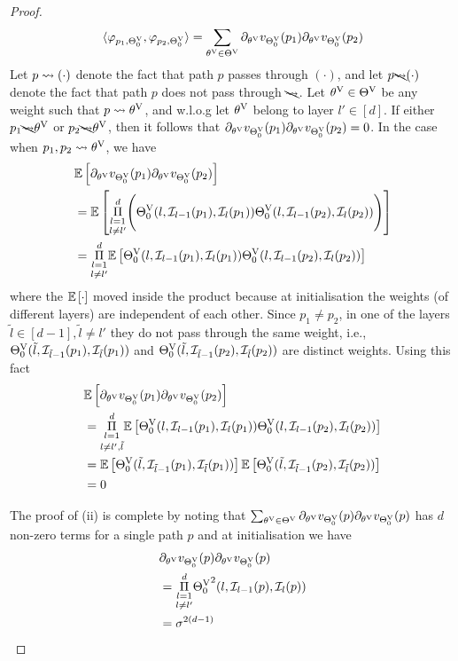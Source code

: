 \begin{appendix}
\begin{proof}
\begin{align*}
\ip{\varphi_{p_1,\Tv_0}, \varphi_{p_2,\Tv_0}}= \sum_{\tv\in \Tv} \partial_{\tv}v_{\Tv_0}(p_1) \partial_{\tv}v_{\Tv_0}(p_2)
\end{align*}
Let $p\rsa(\cdot)$ denote the fact that path $p$ passes through $(\cdot)$, and let $p\bcancel\rsa(\cdot)$ denote the fact that path $p$ does not pass through $\bcancel\rsa$. Let $\tv\in\Tv$ be any weight such that $p\rsa \tv$, and w.l.o.g let $\tv$ belong to layer $l'\in[d]$. If either $p_1\bcancel{\rsa}\tv$ or $p_2\bcancel{\rsa}\tv$, then it follows that $\partial_{\tv} v_{\Tv_0}(p_1) \partial_{\tv} v_{\Tv_0}(p_2)=0$. In the case when $p_1,p_2\rsa\tv$, we have
\begin{align*}
&\E{\partial_{\tv}v_{\Tv_0}(p_1)\partial_{\tv}v_{\Tv_0}(p_2)}\\
&=\E{\underset{l\neq l'}{\underset{l=1}{\overset{d}{\Pi}}} \Bigg(\Tv_0(l, \I_{l-1}(p_1),\I_{l} (p_1))\Tv_0(l,\I_{l-1} (p_2),\I_{l}(p_2)) \Bigg)}\\
&=\underset{l\neq l'}{\underset{l=1}{\overset{d}{\Pi}}}\E{\Tv_0(l,\I_{l-1}(p_1),\I_{l}(p_1))\Tv_0(l,\I_{l-1}(p_2),\I_{l}(p_2))}
\end{align*}
where the $\E{\cdot}$ moved inside the product because at initialisation the weights (of different layers) are independent of each other.
Since $p_1\neq p_2$, in one of the layers $\tilde{l}\in[d-1],\tilde{l}\neq l'$ they do not pass through the same weight, i.e., $\Tv_0(\tilde{l},\I_{\tilde{l}-1}(p_1),\I_{\tilde{l}}(p_1))$ and $\Tv_0(\tilde{l},\I_{\tilde{l}-1}(p_2),\I_{\tilde{l}}(p_2))$ are distinct weights. Using this fact
\begin{align*}
&\E{\partial_{\tv}v_{\Tv_0}(p_1)\partial_{\tv}v_{\Tv_0}(p_2)}\\
&=\underset{l\neq l',\tilde{l}}{\underset{l=1}{\overset{d}{\Pi}}}\E{\Tv_0(l, \I_{l-1}(p_1),\I_l(p_1))\Tv_0(l,\I_{l-1}(p_2),\I_{l}(p_2))}\\
&=\E{\Tv_0(\tilde{l},\I_{\tilde{l}-1} (p_1),\I_{\tilde{l}}(p_1))}\E{\Tv_0(\tilde{l},\I_{\tilde{l}-1 }(p_2),\I_{\tilde{l}}(p_2))}\\
&=0
\end{align*}

The proof of (ii) is complete by noting that $\sum_{\tv\in\Tv} \partial_{\tv}v_{\Tv_0}(p) \partial_{\tv}v_{\Tv_0}(p)$ has $d$ non-zero terms for a single path $p$ and at initialisation we have 
\begin{align*}
&\partial_{\tv}v_{\Tv_0}(p) \partial_{\tv}v_{\Tv_0}(p) \\
&={\underset{l\neq l'}{\underset{l=1}{\overset{d}{\Pi}}} {\Tv_0}^2(l,\I_{l-1}(p),\I_{l}(p))}\\
&=\sigma^{2(d-1)}
\end{align*}
\end{proof}


\end{appendix}

